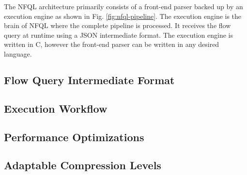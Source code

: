 The \ac{NFQL} architecture primarily consists of a front-end parser backed up
by an execution engine as shown in Fig. \ref{fig:nfql-pipeline}. The execution
engine is the brain of \ac{NFQL} where the complete pipeline is processed. It
receives the flow query at runtime using a JSON \cite{rfc4627} intermediate
format. The execution engine is written in C, however the front-end parser can
be written in any desired language.


\subsection{Flow Query Intermediate Format}

\label{subsec:intermediate-format}

\subsection{Execution Workflow}

\label{subsec:execution-workflow}

\subsection{Performance Optimizations}

\label{subsec:performance-optimizations}

\subsection{Adaptable Compression Levels}

\label{subsec:adaptable-compression-levels}
